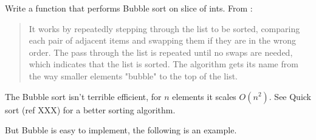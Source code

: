 \begin{Exercise}[title={Bubble sort},difficulty=5]
\label{ex:bubble}
\Question\label{ex:buble q1} Write a function that performs 
Bubble sort on slice of ints. From \cite{bubblesort}:
\begin{quote}
It works by repeatedly stepping through the list to be sorted, comparing each
pair of adjacent items and swapping them if they are in the wrong order. The
pass through the list is repeated until no swaps are needed, which indicates
that the list is sorted. The algorithm gets its name from the way smaller
elements "bubble" to the top of the list. 
\end{quote}

\end{Exercise}

\begin{Answer}
\Question 
The Bubble sort isn't terrible efficient, for $n$ elements it scales
$O(n^2)$. See Quick sort (ref XXX) for a better sorting algorithm.

But Bubble is easy to implement, the following is an example.


\end{Answer}
